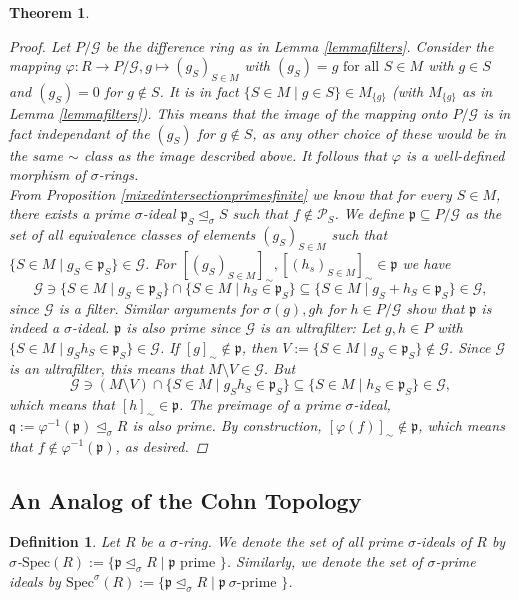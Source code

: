 \documentclass{article}
\def\P{\mathcal{P}}
\def\p{\mathfrak{p}}
\def\q{\mathfrak{q}}
\def\s{\sigma}
\def\si{\unlhd_{\sigma}}
\def\Spec{\text{Spec}}
\def\fa{\text{ for all }}
\newenvironment{bew}{\begin{proof}[Proof]}{\end{proof}}
\theoremstyle{plain}
\newtheorem{theorem}[Satz]{Theorem}
\newtheorem{defn}[Satz]{Definition}
\theoremstyle{definition}
\begin{document}
\begin{theorem}
\begin{bew}
Let $P/\mathcal{G}$ be the difference ring as in Lemma \ref{lemmafilters}. Consider the mapping $\varphi: R \rightarrow P/\mathcal{G}, g \mapsto (g_S)_{S \in M}$ with $(g_S) = g \fa S \in M$ with $g \in S$ and $(g_S) = 0$ for $g \notin S$. 
It is in fact $\{ S \in M \mid g \in S \} \in M_{\{g\}}$ (with $M_{\{g\}}$ as in Lemma \ref{lemmafilters}). This means that the image of the mapping onto $P/\mathcal{G}$ is in fact independant of the $(g_S)$ for $g \notin S$, as any other choice of these would be in the same $\sim$ class as the image described above.
It follows that $\varphi$ is a well-defined morphism of $\s$-rings. \\
\indent From Proposition \ref{mixedintersectionprimesfinite} we know that for every $S \in M$, there exists a prime $\s$-ideal $\p_S \si S$ such that $f \notin \P_S$. 
We define $\p \subseteq P/\mathcal{G}$ as the set of all equivalence classes of elements $(g_S)_{S \in M}$ such that $\{ S \in M \mid g_S \in \p_S \} \in \mathcal{G}$. 
For $[(g_S)_{S \in M}]_{\sim}, [(h_s)_{S \in M}]_{\sim} \in \p$ we have $$ \mathcal{G} \ni \{ S \in M \mid  g_S \in \p_S \} \cap  \{ S \in M \mid  h_S \in \p_S \} \subseteq \{ S \in M \mid  g_S + h_S \in \p_S \} \in \mathcal{G},$$
since $\mathcal{G}$ is a filter. Similar arguments for $\s(g), gh$ for $h \in P/\mathcal{G}$ show that $\p$ is indeed a $\s$-ideal. $\p$ is also prime since $\mathcal{G}$ is an ultrafilter:
Let $g,h \in P$ with $\{ S \in M \mid g_Sh_S \in \p_S \} \in \mathcal{G}$. If $[g]_\sim \notin \p$, then $V:= \{ S \in M \mid g_S \in \p_S \} \notin \mathcal{G}$. Since $\mathcal{G}$ is an ultrafilter, 
this means that $M \setminus V \in \mathcal{G}$. But $$\mathcal{G} \ni (M \setminus V) \cap \{ S \in M \mid g_S h_S \in \p_S \} \subseteq \{ S \in M \mid h_S \in \p_S \} \in \mathcal{G},$$
which means that $[h]_\sim \in \p$. The preimage of a prime $\s$-ideal, $\q := \varphi^{-1}(\p) \si R$ is also prime. By construction, $[\varphi(f)]_\sim \notin \p$, which means that $f \notin \varphi^{-1}(\p)$, as desired. 

\end{bew}
\end{theorem}

\subsection{An Analog of the Cohn Topology}

\begin{defn}
Let $R$ be a $\s$-ring. We denote the set of all prime $\s$-ideals of $R$ by $\s$-$\Spec(R):= \{ \p \si R \mid \p \text{ prime }\}$. Similarly, we denote the set of $\s$-prime ideals by $\Spec^\s(R):= \{ \p \si R \mid \p ~ \s\text{-prime }\}$.
\index{$\s$-$\Spec$} \index{$\Spec^\s$}
\end{defn}
\end{document}
